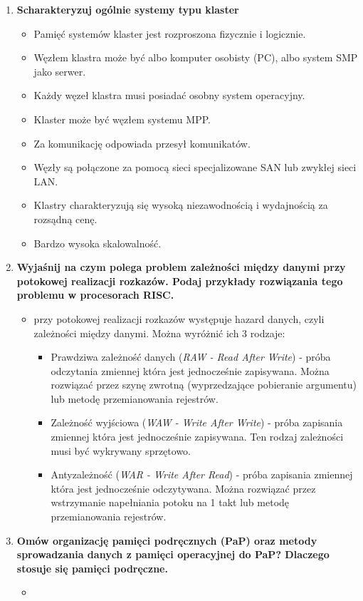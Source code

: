 \begin{enumerate}
\begin{itemize}
			\end{itemize}
			\item \textbf{Scharakteryzuj ogólnie systemy typu klaster}
			\begin{itemize}
				\item Pamięć systemów klaster jest rozproszona fizycznie i logicznie.
				\item Węzłem klastra może być albo komputer osobisty (PC), albo system SMP jako serwer.
				\item Każdy węzeł klastra musi posiadać osobny system operacyjny.
				\item Klaster może być węzłem systemu MPP.
				\item Za komunikację odpowiada przesył komunikatów.
				\item Węzły są połączone za pomocą sieci specjalizowane SAN lub zwykłej sieci LAN.
				\item Klastry charakteryzują się wysoką niezawodnością i wydajnością za rozsądną cenę.
				\item Bardzo wysoka skalowalność.
			\end{itemize}
			\item \textbf{Wyjaśnij na czym polega problem zależności między danymi przy potokowej realizacji rozkazów. Podaj przykłady rozwiązania tego problemu w procesorach RISC.}
			\begin{itemize}
				\item przy potokowej realizacji rozkazów występuje hazard danych, czyli zależności między danymi. Można wyróżnić ich 3 rodzaje:
				\begin{itemize}
					\item Prawdziwa zależność danych (\emph{RAW - Read After Write}) - próba odczytania zmiennej która jest jednocześnie zapisywana. Można rozwiązać przez szynę zwrotną (wyprzedzające pobieranie argumentu) lub metodę przemianowania rejestrów.
					\item Zależność wyjściowa (\emph{WAW - Write After Write}) - próba zapisania zmiennej która jest jednocześnie zapisywana. Ten rodzaj zależności musi być wykrywany sprzętowo.
					\item Antyzależność (\emph{WAR - Write After Read}) - próba zapisania zmiennej która jest jednocześnie odczytywana. Można rozwiązać przez wstrzymanie napełniania potoku na 1 takt lub metodę przemianowania rejestrów.
				\end{itemize}
			\end{itemize}
			\item \textbf{Omów organizację pamięci podręcznych (PaP) oraz metody sprowadzania danych z pamięci operacyjnej do PaP? Dlaczego stosuje się pamięci podręczne.}
			\begin{itemize}
				\item 
			\end{itemize}
		\end{enumerate}
		
